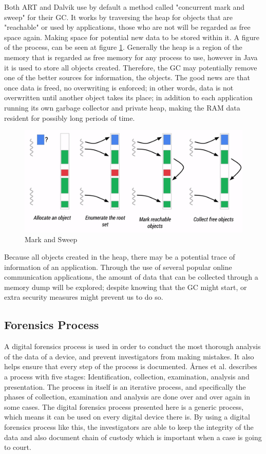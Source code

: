 Both ART and Dalvik use by default a method called "concurrent mark and sweep" for their GC\cite{ARTGC,DALVIKGC}. It works by traversing the heap for objects that are "reachable" or used by applications, those who are not will be regarded as free space again. Making space for potential new data to be stored within it. A figure of the process, can be seen at figure \ref{fig:mas}. Generally the heap is a region of the memory that is regarded as free memory for any process to use, however in Java it is used to store all objects created. Therefore, the GC may potentially remove one of the better sources for information, the objects. The good news are that once data is freed, no overwriting is enforced; in other words, data is not overwritten until another object takes its place\cite{DALVIKGC}; in addition to each application running its own garbage collector and private heap, making the RAM data resident for possibly long periods of time\cite{AndroidMemManagement}.

\begin{figure}[h]
  \includegraphics[width=0.5 \textwidth]{gc}
  \caption{Mark and Sweep\cite{ARTGC}}
  \label{fig:mas}
\end{figure}

Because all objects created in the heap, there may be a potential trace of information of an application. Through the use of several popular online communication applications, the amount of data that can be collected through a memory dump will be explored; despite knowing that the GC might start, or extra security measures might prevent us to do so.

\subsection{Forensics Process}
A digital forensics process is used in order to conduct the most thorough analysis of the data of a device, and prevent investigators from making mistakes. It also helps ensure that every step of the process is documented. \r{A}rnes et al. describes a process with five stages: Identification, collection, examination, analysis and presentation\cite{DiFoBook}. The process in itself is an iterative process, and specifically the phases of collection, examination and analysis are done over and over again in some cases. The digital forensics process presented here is a generic process, which means it can be used on every digital device there is. By using a digital forensics process like this, the investigators are able to keep the integrity of the data and also document chain of custody which is important when a case is going to court. \\

